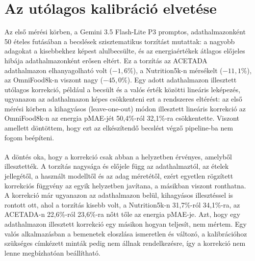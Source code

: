 \section{Az utólagos kalibráció elvetése}
Az első mérési körben, a Gemini 3.5 Flash-Lite P3 promptos, adathalmazonként 50 ételes 
futásában a becslések szisztematikus torzítást mutattak: 
a nagyobb adagokat a kisebbekhez képest alulbecsülte, és az energiaértékek átlagos előjeles hibája 
adathalmazonként erősen eltért. Ez a torzítás
az ACETADA adathalmazon elhanyagolható volt (\mbox{$-1{,}6\%$}), a Nutrition5k-n
mérsékelt (\mbox{$-11{,}1\%$}), az OmniFood8k-n viszont nagy (\mbox{$-45{,}0\%$}).
Egy adott adathalmazon illesztett utólagos korrekció, például a becsült és a valós érték
közötti lineáris leképezés, ugyanazon az adathalmazon képes csökkenteni ezt a rendszeres
eltérést: az első mérési körben a kihagyásos (leave-one-out) módon illesztett lineáris
korrekció az OmniFood8k-n az energia pMAE-jét 50,4\%-ról 32,1\%-ra csökkentette.
Viszont amellett döntöttem, hogy ezt az elkészítendő becslést végző pipeline-ba nem fogom
beépíteni.
\paragraph{}A döntés oka, hogy a korrekció csak abban a helyzetben érvényes, amelyből
illesztették. A torzítás nagysága és előjele függ az adathalmaztól, az ételek jellegétől, a használt modelltől és az adag méretétől,
ezért egyetlen rögzített korrekciós függvény az egyik helyzetben javítana, a másikban
viszont ronthatna. A korrekció már ugyanazon az adathalmazon belül, kihagyásos illesztéssel is 
rontott ott, ahol a torzítás kisebb volt, a Nutrition5k-n 31,7\%-ról 34,1\%-ra, az ACETADA-n 
22,6\%-ról 23,6\%-ra nőtt tőle az energia pMAE-je. Azt, hogy egy adathalmazon illesztett korrekció 
egy másikon hogyan teljesít, nem mértem.
Egy valós alkalmazásban a bemenetek
eloszlása ismeretlen és változó, a kalibrációhoz szükséges címkézett minták pedig nem
állnak rendelkezésre, így a korrekció nem lenne megbízhatóan beállítható.


\clearpage %
